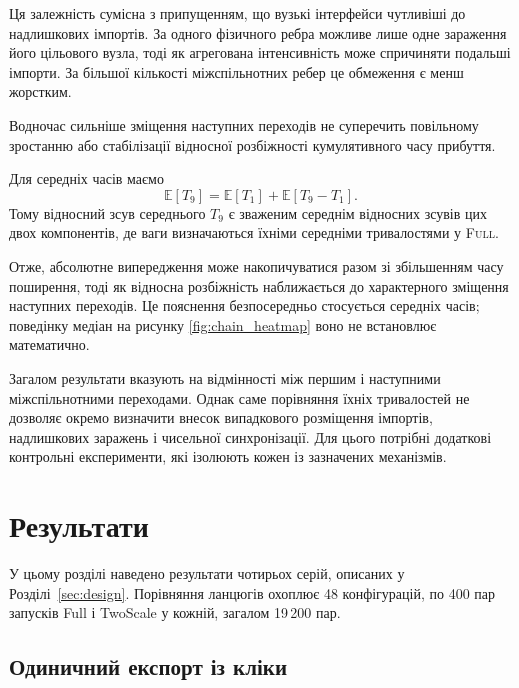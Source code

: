 \documentclass[a4paper,fleqn]{cas-sc}
\newcommand{\Full}{\textup{\textsc{Full}}}
\begin{document}
Ця залежність сумісна
з припущенням, що вузькі
інтерфейси чутливіші
до надлишкових імпортів.
За одного фізичного ребра
можливе лише одне
зараження його цільового
вузла, тоді як агрегована
інтенсивність може
спричиняти подальші імпорти.
За більшої кількості
міжспільнотних ребер
це обмеження є менш
жорстким.

Водночас сильніше зміщення
наступних переходів
не суперечить повільному
зростанню або стабілізації
відносної розбіжності
кумулятивного часу прибуття.

Для середніх часів маємо
\begin{equation}
\mathbb{E}[T_9]
=
\mathbb{E}[T_1]
+
\mathbb{E}[T_9-T_1].
\end{equation}
Тому відносний зсув
середнього $T_9$
є зваженим середнім
відносних зсувів
цих двох компонентів,
де ваги визначаються
їхніми середніми
тривалостями у \Full{}.

Отже, абсолютне випередження
може накопичуватися разом
зі збільшенням часу поширення,
тоді як відносна розбіжність
наближається до характерного
зміщення наступних переходів.
Це пояснення безпосередньо
стосується середніх часів;
поведінку медіан на рисунку
\ref{fig:chain_heatmap} воно
не встановлює математично.

Загалом результати вказують
на відмінності між першим
і наступними міжспільнотними
переходами. Однак саме
порівняння їхніх тривалостей
не дозволяє окремо визначити
внесок випадкового розміщення
імпортів, надлишкових
заражень і чисельної
синхронізації.
Для цього потрібні додаткові
контрольні експерименти,
які ізолюють кожен
із зазначених механізмів.







\section{Результати}
\label{sec:results}

У цьому розділі наведено результати чотирьох серій, описаних у Розділі~\ref{sec:design}.
Порівняння ланцюгів охоплює 48 конфігурацій, по 400 пар запусків Full і TwoScale у кожній, загалом 19\,200 пар.

\subsection{Одиничний експорт із кліки}
\label{sec:res_clique}
\end{document}
